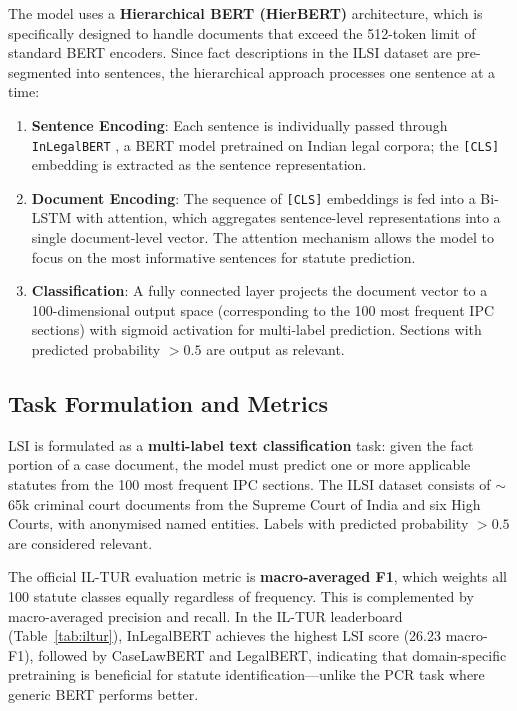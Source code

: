 \documentclass[11pt]{article}
\begin{document}
The model uses a \textbf{Hierarchical BERT (HierBERT)} architecture, which is specifically designed to handle documents that exceed the 512-token limit of standard BERT encoders.
Since fact descriptions in the ILSI dataset are pre-segmented into sentences, the hierarchical approach processes one sentence at a time:
\begin{enumerate}
    \item \textbf{Sentence Encoding}: Each sentence is individually passed through \texttt{InLegalBERT} \cite{paul2022ilsi}, a BERT model pretrained on Indian legal corpora; the \texttt{[CLS]} embedding is extracted as the sentence representation.
    \item \textbf{Document Encoding}: The sequence of \texttt{[CLS]} embeddings is fed into a Bi-LSTM with attention, which aggregates sentence-level representations into a single document-level vector. The attention mechanism allows the model to focus on the most informative sentences for statute prediction.
    \item \textbf{Classification}: A fully connected layer projects the document vector to a 100-dimensional output space (corresponding to the 100 most frequent IPC sections) with sigmoid activation for multi-label prediction. Sections with predicted probability $> 0.5$ are output as relevant.
\end{enumerate}

\subsection{Task Formulation and Metrics}

LSI is formulated as a \textbf{multi-label text classification} task: given the fact portion of a case document, the model must predict one or more applicable statutes from the 100 most frequent IPC sections.
The ILSI dataset \cite{paul2022ilsi} consists of $\sim$65k criminal court documents from the Supreme Court of India and six High Courts, with anonymised named entities.
Labels with predicted probability $> 0.5$ are considered relevant.

The official IL-TUR evaluation metric is \textbf{macro-averaged F1}, which weights all 100 statute classes equally regardless of frequency.
This is complemented by macro-averaged precision and recall.
In the IL-TUR leaderboard (Table~\ref{tab:iltur}), InLegalBERT achieves the highest LSI score (26.23 macro-F1), followed by CaseLawBERT and LegalBERT, indicating that domain-specific pretraining is beneficial for statute identification---unlike the PCR task where generic BERT performs better.
\end{document}
